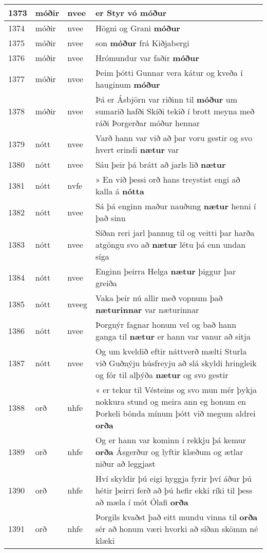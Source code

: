 \documentclass{article}
\begin{document}
\begin{longtable}{p{1cm}|p{1cm}|p{1cm}|p{13cm}}
\hline
1373&móðir&nvee&er Styr vó \textbf{móður} \\
\hline
1374&móðir&nvee&Högni og Grani \textbf{móður} \\
\hline
1375&móðir&nvee&son \textbf{móður} frá Kiðjabergi\\
\hline
1376&móðir&nvee&Hrómundur var faðir \textbf{móður} \\
\hline
1377&móðir&nvee&Þeim þótti Gunnar vera kátur og kveða í hauginum \textbf{móður} \\
\hline
1378&móðir&nvee&Þá er Ásbjörn var riðinn til \textbf{móður} um sumarið hafði Skíði tekið í brott meyna með ráði Þorgerðar móður hennar\\
\hline
1379&nótt&nvee&Varð hann var við að þar voru gestir og svo hvert erindi \textbf{nætur} var\\
\hline
1380&nótt&nvee&Sáu þeir þá brátt að jarls lið \textbf{nætur} \\
\hline
1381&nótt&nvfe&» En við þessi orð hans treystist engi að kalla á \textbf{nótta} \\
\hline
1382&nótt&nvee&Sá þá enginn maður nauðung \textbf{nætur} henni í það sinn\\
\hline
1383&nótt&nvee&Síðan reri jarl þannug til og veitti þar harða atgöngu svo að \textbf{nætur} létu þá enn undan síga\\
\hline
1384&nótt&nvee&Enginn þeirra Helga \textbf{nætur} þiggur þar greiða\\
\hline
1385&nótt&nveeg&Vaka þeir nú allir með vopnum það \textbf{næturinnar} var næturinnar\\
\hline
1386&nótt&nvee&Þorgnýr fagnar honum vel og bað hann ganga til \textbf{nætur} er hann var vanur að sitja\\
\hline
1387&nótt&nvee&Og um kveldið eftir náttverð mælti Sturla við Guðnýju húsfreyju að slá skyldi hringleik og fór til alþýða \textbf{nætur} og svo gestir\\
\hline
1388&orð&nhfe&« er tekur til Vésteins og svo mun mér þykja nokkura stund og meira ann eg honum en Þorkeli bónda mínum þótt við megum aldrei \textbf{orða} \\
\hline
1389&orð&nhfe&Og er hann var kominn í rekkju þá kemur \textbf{orða} Ásgerður og lyftir klæðum og ætlar niður að leggjast\\
\hline
1390&orð&nhfe&Hví skyldir þú eigi hyggja fyrir því áður þú hétir þeirri ferð að þú hefir ekki ríki til þess að mæla í mót Ólafi \textbf{orða} \\
\hline
1391&orð&nhfe&Þorgils kvaðst það eitt mundu vinna til \textbf{orða} sér að honum væri hvorki að síðan skömm né klæki\\

\end{longtable}
\end{document}
